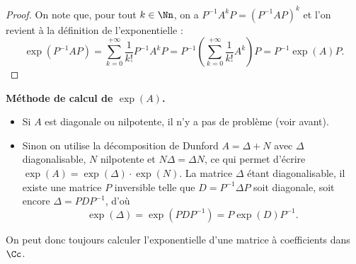 \documentclass[12pt, class=report,crop=false]{standalone}
\begin{document}
\begin{proof}
On note que, pour tout $k\in\Nn$, on a $P^{-1}A^kP=(P^{-1}AP)^k$ 
et l'on revient à la définition de l'exponentielle :
$$\exp(P^{-1}AP)=\sum_{k=0}^{+\infty}{\frac{1}{k!}}P^{-1}A^kP
= P^{-1}\left(\sum_{k=0}^{+\infty}{\frac{1}{k!}}A^k\right)P
= P^{-1}\exp(A) P.$$
\end{proof}


\textbf{Méthode de calcul de $\exp(A)$.}
\begin{itemize}
  \item Si $A$ est diagonale ou nilpotente, il n'y a pas de problème (voir avant).
  \item Sinon on utilise la décomposition de Dunford $A=\Delta+N$ avec $\Delta$ diagonalisable,
  $N$ nilpotente et $N \Delta=\Delta N$, ce qui permet d'écrire $\exp(A)=\exp(\Delta) \cdot \exp(N)$. 
La matrice $\Delta$ étant diagonalisable, il existe une matrice $P$ inversible 
telle que $D = P^{-1} \Delta P$ soit diagonale, soit encore $\Delta = P D P^{-1}$, d'où
$$\exp(\Delta) = \exp(P D P^{-1})=P \exp(D) P^{-1}.$$
\end{itemize}
 
On peut donc toujours calculer l'exponentielle d'une matrice à coefficients dans $\Cc$.
\end{document}
